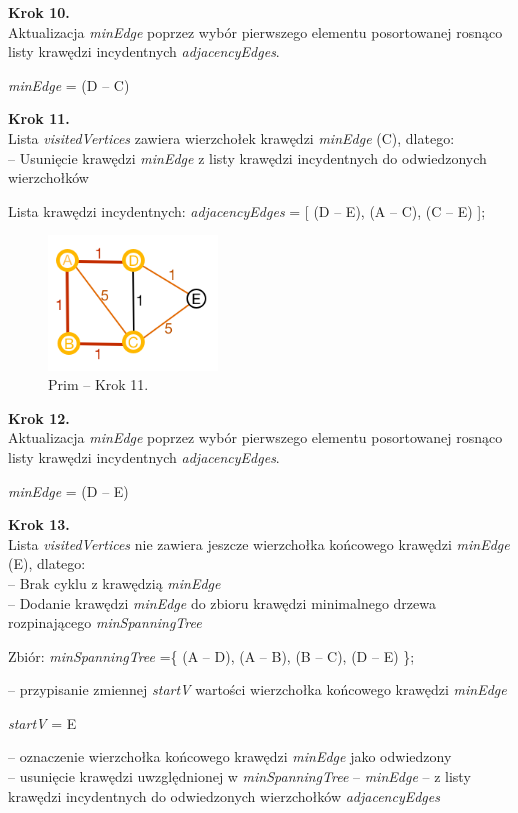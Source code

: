 \textbf{Krok 10.}\\
Aktualizacja \emph{minEdge} poprzez wybór pierwszego elementu posortowanej rosnąco listy krawędzi incydentnych \emph{adjacencyEdges}.\\
\begin{center}
	\emph{minEdge} = (D -- C)
\end{center}

\textbf{Krok 11.}\\
Lista \emph{visitedVertices} zawiera wierzchołek krawędzi \emph{minEdge} (C), dlatego:\\
-- Usunięcie krawędzi \emph{minEdge} z listy krawędzi incydentnych do odwiedzonych wierzchołków
\begin{center}
	Lista krawędzi incydentnych: \emph{adjacencyEdges} = [ (D -- E), (A -- C), (C -- E) ];
\end{center}

\begin{figure}[htb!]
	\centering
	\includegraphics[width=0.4\textwidth]{tex/fig/graf10}
	\caption{Prim -- Krok 11.}
	\label{fig: g10}
\end{figure}
\textbf{Krok 12.}\\
Aktualizacja \emph{minEdge} poprzez wybór pierwszego elementu posortowanej rosnąco listy krawędzi incydentnych \emph{adjacencyEdges}.\\
\begin{center}
	\emph{minEdge} = (D -- E)
\end{center}

\textbf{Krok 13.}\\
Lista \emph{visitedVertices} nie zawiera jeszcze wierzchołka końcowego krawędzi \emph{minEdge} (E), dlatego:\\
-- Brak cyklu z krawędzią \emph{minEdge}\\
-- Dodanie krawędzi \emph{minEdge} do zbioru krawędzi minimalnego drzewa rozpinającego \emph{minSpanningTree}
\begin{center}
	Zbiór: \emph{minSpanningTree} =\{ (A -- D), (A -- B), (B -- C), (D -- E) \};
\end{center}
-- przypisanie zmiennej \emph{startV} wartości wierzchołka końcowego krawędzi \emph{minEdge}
\begin{center}
	\emph{startV} = E
\end{center}
-- oznaczenie wierzchołka końcowego krawędzi \emph{minEdge } jako odwiedzony \\
-- usunięcie krawędzi uwzględnionej w \emph{minSpanningTree} -- \emph{minEdge} -- z listy krawędzi incydentnych do odwiedzonych wierzchołków \emph{adjacencyEdges}

